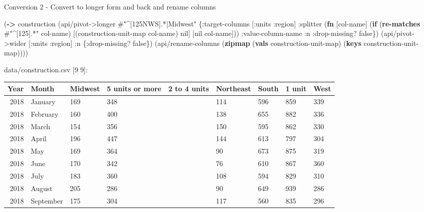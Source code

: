 \documentclass[]{article}
\newenvironment{Shaded}{\begin{snugshade}}{\end{snugshade}}
\newcommand{\KeywordTok}[1]{\textcolor[rgb]{0.13,0.29,0.53}{\textbf{#1}}}
\newcommand{\SpecialStringTok}[1]{\textcolor[rgb]{0.31,0.60,0.02}{#1}}
\newcommand{\VariableTok}[1]{\textcolor[rgb]{0.00,0.00,0.00}{#1}}
\newcommand{\AttributeTok}[1]{\textcolor[rgb]{0.77,0.63,0.00}{#1}}
\newcommand{\NormalTok}[1]{#1}
\begin{document}
Conversion 2 - Convert to longer form and back and rename columns

\begin{Shaded}
\begin{Highlighting}[]
\NormalTok{(}\KeywordTok{->}\NormalTok{ construction}
\NormalTok{    (api/pivot->longer }\SpecialStringTok{#"^[125NWS].*|Midwest"}\NormalTok{ \{}\AttributeTok{:target-columns}\NormalTok{ [}\AttributeTok{:units} \AttributeTok{:region}\NormalTok{]}
                                               \AttributeTok{:splitter}\NormalTok{ (}\KeywordTok{fn}\NormalTok{ [col-name]}
\NormalTok{                                                           (}\KeywordTok{if}\NormalTok{ (}\KeywordTok{re-matches} \SpecialStringTok{#"^[125].*"}\NormalTok{ col-name)}
\NormalTok{                                                             [(construction-unit-map col-name) }\VariableTok{nil}\NormalTok{]}
\NormalTok{                                                             [}\VariableTok{nil}\NormalTok{ col-name]))}
                                               \AttributeTok{:value-column-name} \AttributeTok{:n}
                                               \AttributeTok{:drop-missing}\NormalTok{? }\VariableTok{false}\NormalTok{\})}
\NormalTok{    (api/pivot->wider [}\AttributeTok{:units} \AttributeTok{:region}\NormalTok{] }\AttributeTok{:n}\NormalTok{ \{}\AttributeTok{:drop-missing}\NormalTok{? }\VariableTok{false}\NormalTok{\})}
\NormalTok{    (api/rename-columns (}\KeywordTok{zipmap}\NormalTok{ (}\KeywordTok{vals}\NormalTok{ construction-unit-map)}
\NormalTok{                                (}\KeywordTok{keys}\NormalTok{ construction-unit-map))))}
\end{Highlighting}
\end{Shaded}

data/construction.csv {[}9 9{]}:

\begin{longtable}[]{@{}rllllllll@{}}
\toprule
Year & Month & Midwest & 5 units or more & 2 to 4 units & Northeast &
South & 1 unit & West\tabularnewline
\midrule
\endhead
2018 & January & 169 & 348 & & 114 & 596 & 859 & 339\tabularnewline
2018 & February & 160 & 400 & & 138 & 655 & 882 & 336\tabularnewline
2018 & March & 154 & 356 & & 150 & 595 & 862 & 330\tabularnewline
2018 & April & 196 & 447 & & 144 & 613 & 797 & 304\tabularnewline
2018 & May & 169 & 364 & & 90 & 673 & 875 & 319\tabularnewline
2018 & June & 170 & 342 & & 76 & 610 & 867 & 360\tabularnewline
2018 & July & 183 & 360 & & 108 & 594 & 829 & 310\tabularnewline
2018 & August & 205 & 286 & & 90 & 649 & 939 & 286\tabularnewline
2018 & September & 175 & 304 & & 117 & 560 & 835 & 296\tabularnewline
\bottomrule
\end{longtable}
\end{document}
